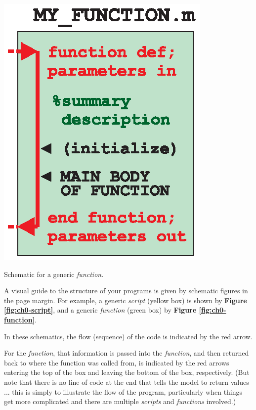 \documentclass{tufte-book} %
\begin{document}
\begin{marginfigure}[-0.0in]
\includegraphics[width=\linewidth]{ch0-function.eps}
\caption{Schematic for a generic \textit{function}.}
\label{fig:ch0-function}
\end{marginfigure}

A visual guide to the structure of your programs is given by schematic figures in the page margin. For example, a generic \textit{script} (yellow box) is shown by \textbf{Figure \ref{fig:ch0-script}}, and a generic \textit{function} (green box) by \textbf{Figure \ref{fig:ch0-function}}. 

In these schematics, the flow (sequence) of the code is indicated by the red arrow. 

For the \textit{function}, that information is passed into the \textit{function}, and then returned back to where the function was called from, is indicated by the red arrows entering the top of the box and leaving the bottom of the box, respectively. (But note that there is no line of code at the end that tells the model to return values ... this is simply to illustrate the flow of the program, particularly when things get more complicated and there are multiple \textit{scripts} and \textit{functions} involved.)
\end{document}
